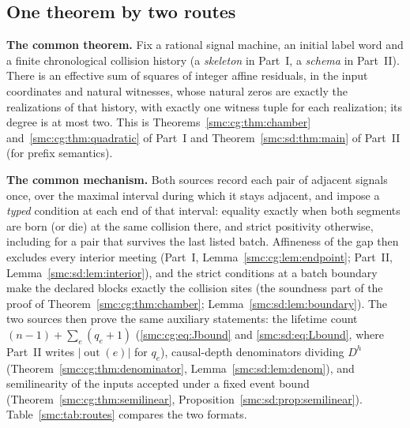 \documentclass[11pt,letterpaper]{article}
\numberwithin{equation}{section}
\theoremstyle{definition}
\theoremstyle{remark}
\newcommand{\out}{\operatorname{out}}
\begin{document}
\subsection{One theorem by two routes}\label{smc:sec:routes}

\textbf{The common theorem.} Fix a rational signal machine, an initial label word and a finite chronological collision history (a \emph{skeleton} in Part~I, a \emph{schema} in Part~II). There is an effective sum of squares of integer affine residuals, in the input coordinates and natural witnesses, whose natural zeros are exactly the realizations of that history, with exactly one witness tuple for each realization; its degree is at most two. This is Theorems~\ref{smc:cg:thm:chamber} and~\ref{smc:cg:thm:quadratic} of Part~I and Theorem~\ref{smc:sd:thm:main} of Part~II (for prefix semantics).

\textbf{The common mechanism.} Both sources record each pair of adjacent signals once, over the maximal interval during which it stays adjacent, and impose a \emph{typed} condition at each end of that interval: equality exactly when both segments are born (or die) at the same collision there, and strict positivity otherwise, including for a pair that survives the last listed batch. Affineness of the gap then excludes every interior meeting (Part~I, Lemma~\ref{smc:cg:lem:endpoint}; Part~II, Lemma~\ref{smc:sd:lem:interior}), and the strict conditions at a batch boundary make the declared blocks exactly the collision sites (the soundness part of the proof of Theorem~\ref{smc:cg:thm:chamber}; Lemma~\ref{smc:sd:lem:boundary}). The two sources then prove the same auxiliary statements: the lifetime count $(n-1)+\sum_e(q_e+1)$ (\eqref{smc:cg:eq:Jbound} and \eqref{smc:sd:eq:Lbound}, where Part~II writes $|\out(e)|$ for $q_e$), causal-depth denominators dividing $D^h$ (Theorem~\ref{smc:cg:thm:denominator}, Lemma~\ref{smc:sd:lem:denom}), and semilinearity of the inputs accepted under a fixed event bound (Theorem~\ref{smc:cg:thm:semilinear}, Proposition~\ref{smc:sd:prop:semilinear}). Table~\ref{smc:tab:routes} compares the two formats.
\end{document}
